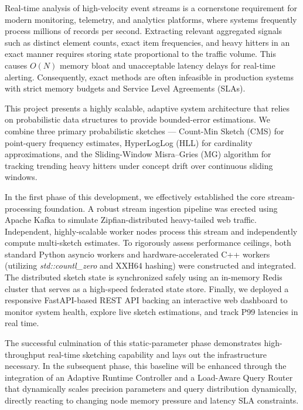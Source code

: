 \noindent
Real-time analysis of high-velocity event streams is a cornerstone requirement for modern monitoring, telemetry, and analytics platforms, where systems frequently process millions of records per second. Extracting relevant aggregated signals such as distinct element counts, exact item frequencies, and heavy hitters in an exact manner requires storing state proportional to the traffic volume. This causes $O(N)$ memory bloat and unacceptable latency delays for real-time alerting. Consequently, exact methods are often infeasible in production systems with strict memory budgets and Service Level Agreements (SLAs).

This project presents a highly scalable, adaptive system architecture that relies on probabilistic data structures to provide bounded-error estimations. We combine three primary probabilistic sketches --- Count-Min Sketch (CMS) for point-query frequency estimates, HyperLogLog (HLL) for cardinality approximations, and the Sliding-Window Misra--Gries (MG) algorithm for tracking trending heavy hitters under concept drift over continuous sliding windows. 

In the first phase of this development, we effectively established the core stream-processing foundation. A robust stream ingestion pipeline was erected using Apache Kafka to simulate Zipfian-distributed heavy-tailed web traffic. Independent, highly-scalable worker nodes process this stream and independently compute multi-sketch estimates. To rigorously assess performance ceilings, both standard Python asyncio workers and hardware-accelerated C++ workers (utilizing \textit{std::countl\_zero} and XXH64 hashing) were constructed and integrated. The distributed sketch state is synchronized safely using an in-memory Redis cluster that serves as a high-speed federated state store. Finally, we deployed a responsive FastAPI-based REST API backing an interactive web dashboard to monitor system health, explore live sketch estimations, and track P99 latencies in real time. 

The successful culmination of this static-parameter phase demonstrates high-throughput real-time sketching capability and lays out the infrastructure necessary. In the subsequent phase, this baseline will be enhanced through the integration of an Adaptive Runtime Controller and a Load-Aware Query Router that dynamically scales precision parameters and query distribution dynamically, directly reacting to changing node memory pressure and latency SLA constraints. 
